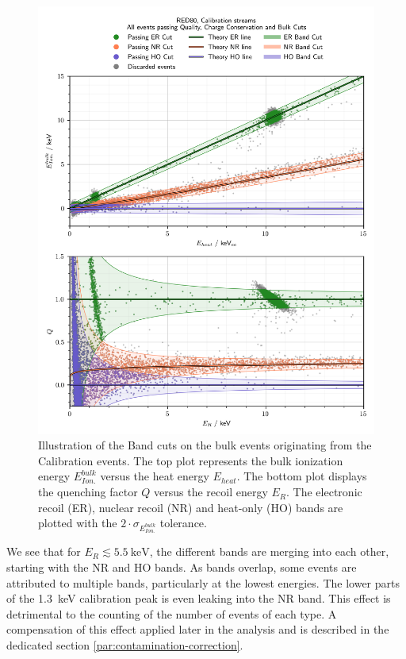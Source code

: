 \begin{figure}
\centering
\includegraphics[scale=1]{Figures/Neutron/band_cuts.png}
\caption{Illustration of the Band cuts on the bulk events originating from the Calibration events. The top plot represents the bulk ionization energy $E_{Ion.}^{bulk}$ versus the heat energy $E_{heat}$. The bottom plot displays the quenching factor $Q$ versus the recoil energy $E_R$. The electronic recoil (ER), nuclear recoil (NR) and heat-only (HO) bands are plotted with the $2 \cdot \sigma_{E_{Ion.}^{bulk}}$ tolerance.}
\label{fig:band-cuts}
\end{figure}

We see that for $E_R \lesssim \SI{5.5}{\kilo\eV}$, the different bands are merging into each other, starting with the NR and HO bands. As bands overlap, some events are attributed to multiple bands, particularly at the lowest energies. The lower parts of the \SI{1.3}{\kilo\eV} calibration peak is even leaking into the NR band. This effect is detrimental to the counting of the number of events of each type. A compensation of this effect applied later in the analysis and is described in the dedicated section \ref{par:contamination-correction}.

